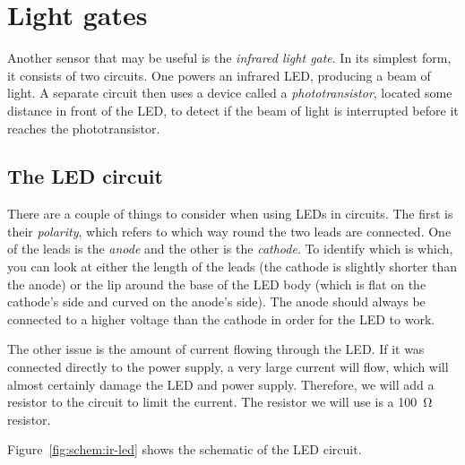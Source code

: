 \documentclass{article}
\begin{document}



\section{Light gates}

Another sensor that may be useful is the \emph{infrared light gate}. In its
simplest form, it consists of two circuits. One powers an infrared LED,
producing a beam of light. A separate circuit then uses a device called a
\emph{phototransistor}, located some distance in front of the LED, to detect if
the beam of light is interrupted before it reaches the phototransistor.

\subsection{The LED circuit}

There are a couple of things to consider when using LEDs in circuits. The first
is their \emph{polarity}, which refers to which way round the two leads are
connected. One of the leads is the \emph{anode} and the other is the
\emph{cathode}. To identify which is which, you can look at either the length of
the leads (the cathode is slightly shorter than the anode) or the lip around the
base of the LED body (which is flat on the cathode's side and curved on the
anode's side). The anode should always be connected to a higher voltage than the
cathode in order for the LED to work.

The other issue is the amount of current flowing through the LED. If it was
connected directly to the power supply, a very large current will flow, which
will almost certainly damage the LED and power supply. Therefore, we will add a
resistor to the circuit to limit the current. The resistor we will use is a
\SI{100}{\ohm} resistor.

Figure~\ref{fig:schem:ir-led} shows the schematic of the LED circuit.
\end{document}
